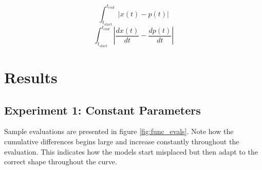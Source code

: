 \documentclass[11pt]{article}
\begin{document}
\begin{equation}
  \int_{t_{start}}^{t_{end}} | x(t) - p(t) |
\label{eq:cumabs}
\end{equation}
\begin{equation}
  \int_{t_{start}}^{t_{end}} | \frac{dx(t)}{dt} - \frac{dp(t)}{dt} |
\label{eq:cumabsderiv}
\end{equation}

\section {Results}
\subsection {Experiment 1: Constant Parameters}
 Sample evaluations are presented
  in figure \ref{fig:func_evals}.  Note how the cumulative
   differences begins large and increase constantly throughout the evaluation. This indicates how the models start misplaced but then adapt to the correct shape throughout the curve.
\end{document}
